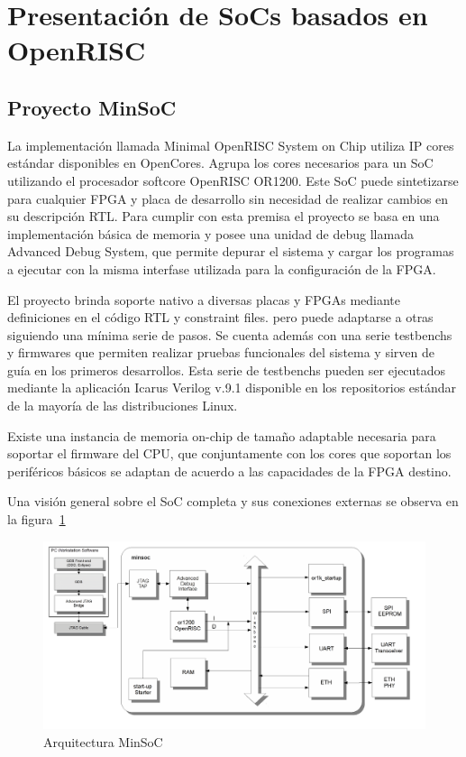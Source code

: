 \section{Presentación de SoCs basados en OpenRISC}  \label{sec:minsoc}
				
				\subsection{Proyecto MinSoC}
				La implementación llamada Minimal OpenRISC System on Chip utiliza IP cores estándar disponibles en OpenCores. Agrupa los cores necesarios para un SoC utilizando el procesador softcore OpenRISC OR1200. Este SoC puede sintetizarse para cualquier FPGA y placa de desarrollo sin necesidad de realizar cambios en su descripción RTL. Para cumplir con esta premisa el proyecto se basa en una implementación básica de memoria y posee una unidad de debug llamada Advanced Debug System, que permite depurar el sistema y cargar los programas a ejecutar con la misma interfase utilizada para la configuración de la FPGA.		

El proyecto brinda soporte nativo a diversas placas y FPGAs mediante definiciones en el código RTL y constraint files.
				pero puede adaptarse a otras siguiendo una mínima serie de pasos. Se cuenta además con una serie testbenchs y firmwares que permiten realizar
				pruebas funcionales del sistema y sirven de guía en los primeros desarrollos. Esta serie de testbenchs pueden ser ejecutados mediante la
				aplicación Icarus Verilog v.9.1 disponible en los repositorios estándar de la mayoría de las distribuciones Linux. 
				
				Existe una instancia de memoria on-chip de tamaño adaptable necesaria para soportar el firmware del CPU, que conjuntamente con los cores que
				soportan los periféricos básicos se adaptan de acuerdo a las capacidades de la FPGA destino. 

Una visión general sobre el SoC completa y sus conexiones externas se observa en la figura~\ref{fig:esquemaminsoc}

\begin{figure}[h!]
 \begin{center}
  \includegraphics[width=1\textwidth,keepaspectratio=true]{./images/minsoc}
  \caption{Arquitectura MinSoC}
  \label{fig:esquemaminsoc}
 \end{center}
\end{figure}

